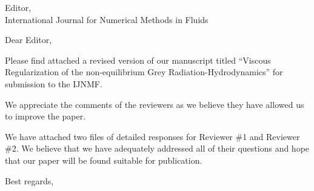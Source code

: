 
        \addtolength{\topmargin}{-4.0cm}    %
       \addtolength{\textheight}{7.5cm}    %

\address{Jean Ragusa\\ 
Department of Nuclear Engineering \\
Texas A\&M University\\
College Station, TX 77843-3133, USA\\
phone: (979) 862 2033\\
e-mail: jean.ragusa@tamu.edu \vspace{0.5cm}}


\signature{\vspace{-1.25cm}Marc-Olivier Delchini, Jean Ragusa}   




\begin{letter}{
    Editor,\\
    International Journal for Numerical Methods in Fluids}
\date{\today}

\opening{Dear Editor,}
         \vspace{0.25cm}

Please find attached a revised version of our manuscript titled ``Viscous Regularization of the non-equilibrium Grey Radiation-Hydrodynamics'' for submission to the IJNMF. 

We appreciate the comments of the reviewers as we believe they have allowed us to improve the paper.

We have attached two files of detailed responses for Reviewer \#1 and Reviewer \#2. We believe that we have adequately addressed all of their questions and hope that our paper will be found suitable for publication.




\closing{Best regards, }

\end{letter}


